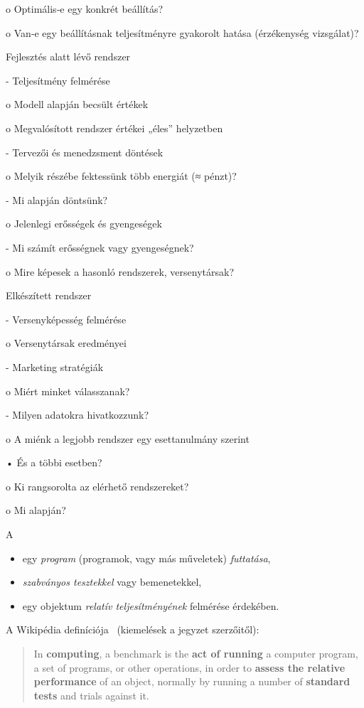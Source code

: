 o Optimális‐e egy konkrét beállítás?

o Van‐e egy beállításnak teljesítményre gyakorolt hatása 
(érzékenység vizsgálat)?

Fejlesztés alatt lévő rendszer

- Teljesítmény felmérése

o Modell alapján becsült értékek

o Megvalósított rendszer értékei „éles” helyzetben

- Tervezői és menedzsment döntések

o Melyik részébe fektessünk több energiát (≈ pénzt)? 

- Mi alapján döntsünk?

o Jelenlegi erősségek és gyengeségek

- Mi számít erősségnek vagy gyengeségnek?

o Mire képesek a hasonló rendszerek, versenytársak?

Elkészített rendszer

- Versenyképesség felmérése

o Versenytársak eredményei

- Marketing stratégiák

o Miért minket válasszanak?

- Milyen adatokra hivatkozzunk?

o A miénk a legjobb rendszer egy esettanulmány szerint

• És a többi esetben?

o Ki rangsorolta az elérhető rendszereket?

o Mi alapján?

\begin{definicio}
	A 
	\begin{itemize}
		\item egy \emph{program} (programok, vagy más műveletek) \emph{futtatása},
		\item \emph{szabványos tesztekkel} vagy bemenetekkel,
		\item egy objektum \emph{relatív teljesítményének} felmérése érdekében.
	\end{itemize}
\end{definicio}

A Wikipédia definíciója~\cite{wiki:benchmark} (kiemelések a jegyzet szerzőitől):

\begin{quote}
	In \textbf{computing}, a benchmark is the \textbf{act of running} a computer program, a set of programs, or other operations, in order to \textbf{assess the relative performance} of an object, normally by running a number of \textbf{standard tests} and trials against it.
\end{quote}

